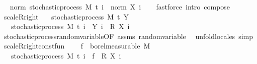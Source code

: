 \begin{isabellebody}
\endisatagproof
{\isafoldproof}%
%
\isadelimproof
\ \isanewline
%
\endisadelimproof
\isanewline
{}\isamarkupfalse%
\ norm{\isacharcolon}{\kern0pt}\ {\isachardoublequoteopen}stochastic{\isacharunderscore}{\kern0pt}process\ M\ t\ {\isacharparenleft}{\kern0pt}{\isasymlambda}i\ {\isasymxi}{\isachardot}{\kern0pt}\ norm\ {\isacharparenleft}{\kern0pt}X\ i\ {\isasymxi}{\isacharparenright}{\kern0pt}{\isacharparenright}{\kern0pt}{\isachardoublequoteclose}%
\isadelimproof
\ %
\endisadelimproof
%
\isatagproof
{}\isamarkupfalse%
\ {\isacharparenleft}{\kern0pt}fastforce\ intro{\isacharcolon}{\kern0pt}\ compose{\isacharparenright}{\kern0pt}%
\endisatagproof
{\isafoldproof}%
%
\isadelimproof
%
\endisadelimproof
\isanewline
\isanewline
{}\isamarkupfalse%
\ scaleR{\isacharunderscore}{\kern0pt}right{\isacharcolon}{\kern0pt}\isanewline
\ \ \ {\isachardoublequoteopen}stochastic{\isacharunderscore}{\kern0pt}process\ M\ t\ Y{\isachardoublequoteclose}\isanewline
\ \ \ {\isachardoublequoteopen}stochastic{\isacharunderscore}{\kern0pt}process\ M\ t\ {\isacharparenleft}{\kern0pt}{\isasymlambda}i\ {\isasymxi}{\isachardot}{\kern0pt}\ {\isacharparenleft}{\kern0pt}Y\ i\ {\isasymxi}{\isacharparenright}{\kern0pt}\ {\isacharasterisk}{\kern0pt}\isactrlsub R\ {\isacharparenleft}{\kern0pt}X\ i\ {\isasymxi}{\isacharparenright}{\kern0pt}{\isacharparenright}{\kern0pt}{\isachardoublequoteclose}\isanewline
%
\isadelimproof
\ \ %
\endisadelimproof
%
\isatagproof
{}\isamarkupfalse%
\ stochastic{\isacharunderscore}{\kern0pt}process{\isachardot}{\kern0pt}random{\isacharunderscore}{\kern0pt}variable{\isacharbrackleft}{\kern0pt}OF\ assms{\isacharbrackright}{\kern0pt}\ random{\isacharunderscore}{\kern0pt}variable\ \isamarkupfalse%
\ {\isacharparenleft}{\kern0pt}unfold{\isacharunderscore}{\kern0pt}locales{\isacharparenright}{\kern0pt}\ simp%
\endisatagproof
{\isafoldproof}%
%
\isadelimproof
\isanewline
%
\endisadelimproof
\isanewline
{}\isamarkupfalse%
\ scaleR{\isacharunderscore}{\kern0pt}right{\isacharunderscore}{\kern0pt}const{\isacharunderscore}{\kern0pt}fun{\isacharcolon}{\kern0pt}\ \isanewline
\ \ \ {\isachardoublequoteopen}f\ {\isasymin}\ borel{\isacharunderscore}{\kern0pt}measurable\ M{\isachardoublequoteclose}\ \isanewline
\ \ \ {\isachardoublequoteopen}stochastic{\isacharunderscore}{\kern0pt}process\ M\ t\ {\isacharparenleft}{\kern0pt}{\isasymlambda}i\ {\isasymxi}{\isachardot}{\kern0pt}\ f\ {\isasymxi}\ {\isacharasterisk}{\kern0pt}\isactrlsub R\ {\isacharparenleft}{\kern0pt}X\ i\ {\isasymxi}{\isacharparenright}{\kern0pt}{\isacharparenright}{\kern0pt}{\isachardoublequoteclose}\ \isanewline

\end{isabellebody}
